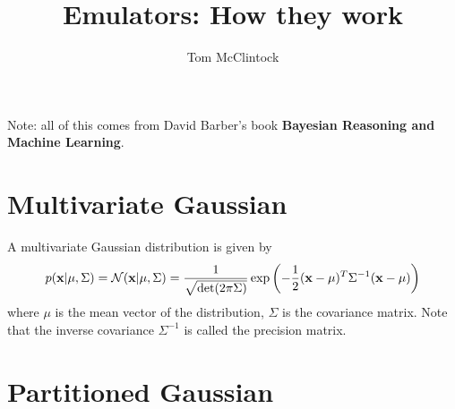 \documentclass[11pt,twoside,a5paper]{article}
\newcommand{\bfx}{{\bf x}}
\newcommand{\norm}{{\cal N}}
\begin{document}
\title{Emulators: How they work}
\author{Tom McClintock}
\maketitle

\noindent Note: all of this comes from David Barber's book 
{\bf Bayesian Reasoning and Machine Learning}.

\section{Multivariate Gaussian}

A multivariate Gaussian distribution is given by
\begin{equation}
  \label{eq:multivariate_gaussian}
  p(\bfx|\mu,\Sigma) = \norm(\bfx|\mu,\Sigma)= \frac{1}{\sqrt{\det(2\pi\Sigma)}}\exp\left(-\frac{1}{2}(\bfx-\mu)^T\Sigma^{-1}(\bfx-\mu)\right)
\end{equation}
where $\mu$ is the mean vector of the distribution, $\Sigma$ is the covariance matrix. Note that the inverse covariance $\Sigma^{-1}$ is called the precision matrix.

\section{Partitioned Gaussian}
\end{document}
